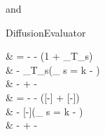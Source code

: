and
\begin{equationCode}{DiffusionEvaluator}
\begin{split}
 & = - 
                                  - \left(1 + \thermcoef_{T_s}\right) \\
                              & \fakeequalspace
                                  - \thermcoef_{T_s}\left(_{ s = k} -   \right) \\
                              & \fakeequalspace   
                                  -  +  
                                  -  \\[10pt]
\uu\frac{[cm^2\,s^{-1}\,km^{-1}]}{[cm^{-3}]} & \uu = - \frac{[cm^2\,s^{-1}]}{[cm^{-3}]}\frac{[-]}{[km]}
                                  - \frac{[cm^2\,s^{-1}]}{[cm^{-3}]}\frac{[-]}{[K]}\frac{[K]}{[km]}\left([-] + \frac{[cm^{-3}] - [cm^{-3}]}{[cm^{-3}]}[-]\right) \\
                              & \uu \fakeequalspace
                                  - \frac{[cm^2\,s^{-1}]}{[K]}\frac{[K]}{[km]}[-]\left(\underbrace{\uu\frac{[-]}{[cm^{-3}]}}_{ s = k} -   \right) \\
                              & \uu \fakeequalspace
                                  - \frac{[cm^2\,s^{-1}]}{[cm^{-3}]}\frac{[-]}{[km]} + \frac{[km]}{[cm^{-3}]} 
                                  - \frac{[cm^2\,s^{-1}]}{[cm^{-3}]}\frac{[-]}{[K]}\frac{[K]}{[km]}
\end{split}
\end{equationCode}
